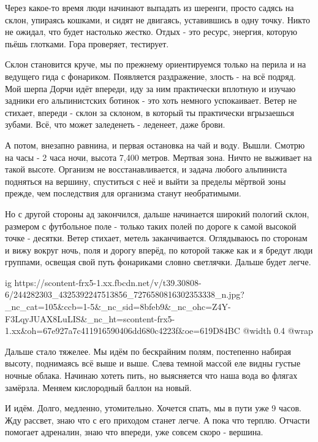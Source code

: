 
Через какое-то время люди начинают выпадать из шеренги, просто садясь на склон,
упираясь кошками, и сидят не двигаясь, уставившись в одну точку. Никто не
ожидал, что будет настолько жестко. Отдых - это ресурс, энергия, которую пьёшь
глотками. Гора проверяет, тестирует. 

Склон становится круче, мы по прежнему ориентируемся только на перила и на
ведущего гида с фонариком. Появляется раздражение, злость - на всё подряд. Мой
шерпа Дорчи идёт впереди, иду за ним практически вплотную и изучаю задники его
альпинистских ботинок - это хоть немного успокаивает. Ветер не стихает, впереди
- склон за склоном, в который ты практически вгрызаешься зубами. Всё, что может
заледенеть - леденеет, даже брови. 


А потом, внезапно равнина, и первая остановка на чай и воду. Вышли. Смотрю на
часы - 2 часа ночи, высота 7,400 метров. Мертвая зона. Ничто не выживает на
такой высоте. Организм не восстанавливается, и задача любого альпиниста
подняться на вершину, спуститься с неё и выйти за пределы мёртвой зоны прежде,
чем последствия для организма станут необратимыми. 

Но с другой стороны ад закончился, дальше начинается широкий пологий склон,
размером с футбольное поле - только таких полей по дороге к самой высокой точке
- десятки. Ветер стихает, метель заканчивается. Оглядываюсь по сторонам и вижу
вокруг ночь, поля и дорогу вперёд, по которой также как и я бредут люди
группами, освещая свой путь фонариками словно светлячки. Дальше будет легче. 

\ifcmt
  ig https://scontent-frx5-1.xx.fbcdn.net/v/t39.30808-6/244282303_4325392247513856_7276580816302353338_n.jpg?_nc_cat=105&ccb=1-5&_nc_sid=8bfeb9&_nc_ohc=Z4Y-F3LqyJUAX8LuLIS&_nc_ht=scontent-frx5-1.xx&oh=67e927a7c411916590406dd680c4223f&oe=619D84BC
  @width 0.4
  @wrap 
\fi

Дальше стало тяжелее. Мы идём по бескрайним полям, постепенно набирая высоту,
поднимаясь всё выше и выше. Слева темной массой еле видны густые ночные облака.
Начинаю хотеть пить, но выясняется что наша вода во флягах замёрзла. Меняем
кислородный баллон на новый. 

И идём. Долго, медленно, утомительно. Хочется спать, мы в пути уже 9 часов. Жду
рассвет, знаю что с его приходом станет легче. А пока что терплю. Отчасти
помогает адреналин, знаю что впереди, уже совсем скоро - вершина. 

